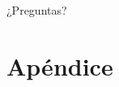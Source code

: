 \documentclass[24pt,aspectratio=169]{beamer}
\begin{document}
\begin{frame}[standout]
  ¿Preguntas?
\end{frame}

\appendix

\section{Apéndice}

 

  

\end{document}

